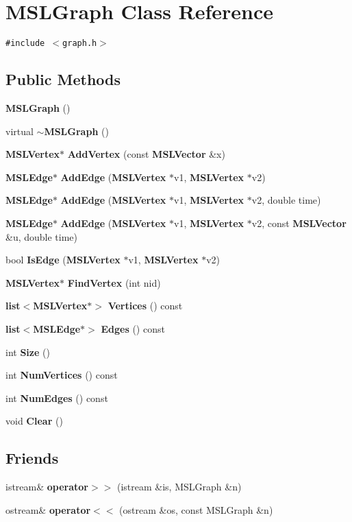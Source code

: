 \section{MSLGraph  Class Reference}
\label{classMSLGraph}
{\tt \#include $<$graph.h$>$}

\subsection*{Public Methods}
\begin{CompactItemize}
\item 
{\bf MSLGraph} ()
\item 
virtual {\bf $\sim$MSLGraph} ()
\item 
{\bf MSLVertex}$\ast$ {\bf Add\-Vertex} (const {\bf MSLVector} \&x)
\item 
{\bf MSLEdge}$\ast$ {\bf Add\-Edge} ({\bf MSLVertex} $\ast$v1, {\bf MSLVertex} $\ast$v2)
\item 
{\bf MSLEdge}$\ast$ {\bf Add\-Edge} ({\bf MSLVertex} $\ast$v1, {\bf MSLVertex} $\ast$v2, double time)
\item 
{\bf MSLEdge}$\ast$ {\bf Add\-Edge} ({\bf MSLVertex} $\ast$v1, {\bf MSLVertex} $\ast$v2, const {\bf MSLVector} \&u, double time)
\item 
bool {\bf Is\-Edge} ({\bf MSLVertex} $\ast$v1, {\bf MSLVertex} $\ast$v2)
\item 
{\bf MSLVertex}$\ast$ {\bf Find\-Vertex} (int nid)
\item 
{\bf list}$<${\bf MSLVertex}$\ast$$>$ {\bf Vertices} () const
\item 
{\bf list}$<${\bf MSLEdge}$\ast$$>$ {\bf Edges} () const
\item 
int {\bf Size} ()
\item 
int {\bf Num\-Vertices} () const
\item 
int {\bf Num\-Edges} () const
\item 
void {\bf Clear} ()
\end{CompactItemize}
\subsection*{Friends}
\begin{CompactItemize}
\item 
istream\& {\bf operator$>$$>$} (istream \&is, MSLGraph \&n)
\item 
ostream\& {\bf operator$<$$<$} (ostream \&os, const MSLGraph \&n)
\end{CompactItemize}


